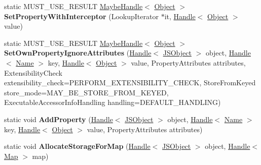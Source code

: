 \begin{DoxyCompactItemize}
\item 
\hypertarget{classv8_1_1internal_1_1_j_s_object_ab31ce06ce4a0bd8169fefab1a5ab9feb}{}static M\+U\+S\+T\+\_\+\+U\+S\+E\+\_\+\+R\+E\+S\+U\+L\+T \hyperlink{classv8_1_1internal_1_1_maybe_handle}{Maybe\+Handle}$<$ \hyperlink{classv8_1_1internal_1_1_object}{Object} $>$ {\bfseries Set\+Property\+With\+Interceptor} (Lookup\+Iterator $\ast$it, \hyperlink{classv8_1_1internal_1_1_handle}{Handle}$<$ \hyperlink{classv8_1_1internal_1_1_object}{Object} $>$ value)\label{classv8_1_1internal_1_1_j_s_object_ab31ce06ce4a0bd8169fefab1a5ab9feb}

\item 
\hypertarget{classv8_1_1internal_1_1_j_s_object_a18ba9a7d058f23cc23a04d237ad64c98}{}static M\+U\+S\+T\+\_\+\+U\+S\+E\+\_\+\+R\+E\+S\+U\+L\+T \hyperlink{classv8_1_1internal_1_1_maybe_handle}{Maybe\+Handle}$<$ \hyperlink{classv8_1_1internal_1_1_object}{Object} $>$ {\bfseries Set\+Own\+Property\+Ignore\+Attributes} (\hyperlink{classv8_1_1internal_1_1_handle}{Handle}$<$ \hyperlink{classv8_1_1internal_1_1_j_s_object}{J\+S\+Object} $>$ object, \hyperlink{classv8_1_1internal_1_1_handle}{Handle}$<$ \hyperlink{classv8_1_1internal_1_1_name}{Name} $>$ key, \hyperlink{classv8_1_1internal_1_1_handle}{Handle}$<$ \hyperlink{classv8_1_1internal_1_1_object}{Object} $>$ value, Property\+Attributes attributes, Extensibility\+Check extensibility\+\_\+check=P\+E\+R\+F\+O\+R\+M\+\_\+\+E\+X\+T\+E\+N\+S\+I\+B\+I\+L\+I\+T\+Y\+\_\+\+C\+H\+E\+C\+K, Store\+From\+Keyed store\+\_\+mode=M\+A\+Y\+\_\+\+B\+E\+\_\+\+S\+T\+O\+R\+E\+\_\+\+F\+R\+O\+M\+\_\+\+K\+E\+Y\+E\+D, Executable\+Accessor\+Info\+Handling handling=D\+E\+F\+A\+U\+L\+T\+\_\+\+H\+A\+N\+D\+L\+I\+N\+G)\label{classv8_1_1internal_1_1_j_s_object_a18ba9a7d058f23cc23a04d237ad64c98}

\item 
\hypertarget{classv8_1_1internal_1_1_j_s_object_aaf96515a2b0dc92039fb4b8111098e83}{}static void {\bfseries Add\+Property} (\hyperlink{classv8_1_1internal_1_1_handle}{Handle}$<$ \hyperlink{classv8_1_1internal_1_1_j_s_object}{J\+S\+Object} $>$ object, \hyperlink{classv8_1_1internal_1_1_handle}{Handle}$<$ \hyperlink{classv8_1_1internal_1_1_name}{Name} $>$ key, \hyperlink{classv8_1_1internal_1_1_handle}{Handle}$<$ \hyperlink{classv8_1_1internal_1_1_object}{Object} $>$ value, Property\+Attributes attributes)\label{classv8_1_1internal_1_1_j_s_object_aaf96515a2b0dc92039fb4b8111098e83}

\item 
\hypertarget{classv8_1_1internal_1_1_j_s_object_a03637647218c927f73ff61a2a94318ba}{}static void {\bfseries Allocate\+Storage\+For\+Map} (\hyperlink{classv8_1_1internal_1_1_handle}{Handle}$<$ \hyperlink{classv8_1_1internal_1_1_j_s_object}{J\+S\+Object} $>$ object, \hyperlink{classv8_1_1internal_1_1_handle}{Handle}$<$ \hyperlink{classv8_1_1internal_1_1_map}{Map} $>$ map)\label{classv8_1_1internal_1_1_j_s_object_a03637647218c927f73ff61a2a94318ba}


\end{DoxyCompactItemize}
